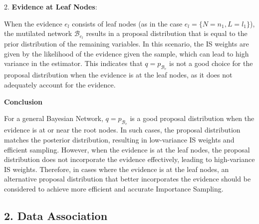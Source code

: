 \documentclass[a4 paper]{article}
\begin{document}
2. \textbf{Evidence at Leaf Nodes}:

   When the evidence \( e_l \) consists of leaf nodes (as in the case \( e_l = \{N = n_1, L = l_1\} \)), the mutilated network \( \mathcal{B}_{e_l} \) results in a proposal distribution that is equal to the prior distribution of the remaining variables. In this scenario, the IS weights are given by the likelihood of the evidence given the sample, which can lead to high variance in the estimator. This indicates that \( q = p_{\mathcal{B}_e} \) is not a good choice for the proposal distribution when the evidence is at the leaf nodes, as it does not adequately account for the evidence.

\textbf{Conclusion}

For a general Bayesian Network, \( q = p_{\mathcal{B}_e} \) is a good proposal distribution when the evidence is at or near the root nodes. In such cases, the proposal distribution matches the posterior distribution, resulting in low-variance IS weights and efficient sampling. However, when the evidence is at the leaf nodes, the proposal distribution does not incorporate the evidence effectively, leading to high-variance IS weights. Therefore, in cases where the evidence is at the leaf nodes, an alternative proposal distribution that better incorporates the evidence should be considered to achieve more efficient and accurate Importance Sampling.





\newpage
\subsection*{2. Data Association}
\end{document}
